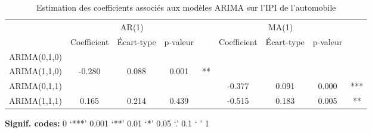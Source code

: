 \documentclass[,french]{article}
\begin{document}
\begin{table}[!h]

\caption{\label{tab:tabcoefs}Estimation des coefficients associés aux modèles ARIMA sur l'IPI de l'automobile}
\centering
\begin{threeparttable}
\begin{tabular}[t]{lcccccccc}
\toprule
\multicolumn{1}{c}{ } & \multicolumn{3}{c}{AR(1)} & \multicolumn{1}{c}{ } & \multicolumn{3}{c}{MA(1)} & \multicolumn{1}{c}{ } \\
\cmidrule(l{3pt}r{3pt}){2-4} \cmidrule(l{3pt}r{3pt}){6-8}
  & Coefficient & Écart-type & p-valeur &  & Coefficient & Écart-type & p-valeur & \\
\midrule
ARIMA(0,1,0) &  &  &  &  &  &  &  & \\
ARIMA(1,1,0) & -0.280 & 0.088 & 0.001 & ** &  &  &  & \\
ARIMA(0,1,1) &  &  &  &  & -0.377 & 0.091 & 0.000 & ***\\
ARIMA(1,1,1) & 0.165 & 0.214 & 0.439 &  & -0.515 & 0.183 & 0.005 & **\\
\bottomrule
\end{tabular}
\begin{tablenotes}
\item \hspace{-0.4cm}\textbf{Signif. codes: }0 `***' 0.001 `**' 0.01 `*' 0.05 `.' 0.1 ` ' 1
\end{tablenotes}
\end{threeparttable}
\end{table}
\end{document}
